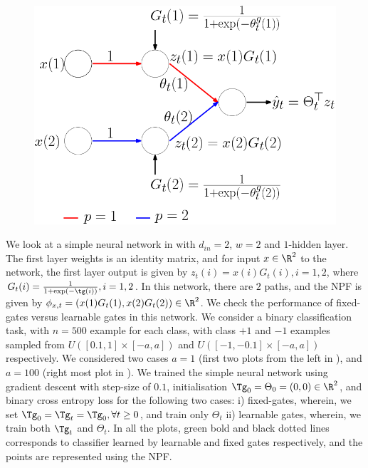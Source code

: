 \begin{figure}
\includegraphics[scale=0.14]{figs/featlearn.png}
\caption{\label{fig:net}}
\end{figure}
We look at a simple neural network in  with $d_{in}=2$, $w=2$ and $1$-hidden layer. The first layer weights is an identity matrix, and for input $x\in\R^2$ to the network, the first layer output is given by $z_{t}(i)=x(i)G_t(i),i=1,2$, where $G_t(i)=\frac{1}{1+\exp(-\tg(i))},i=1,2$. In this network, there are $2$ paths, and the NPF is given by $\phi_{x,t}=(x(1)G_t(1),x(2)G_t(2))\in \R^2$. We check the performance of fixed-gates versus learnable gates in this network. We consider a binary classification task, with $n=500$ example for each class, with class $+1$ and $-1$  examples sampled from $U([0.1,1]\times [-a,a])$ and $U([-1,-0.1]\times[-a,a])$ respectively. \WFclear We considered two cases $a=1$ (first two plots from the left in ), and $a=100$ (right most plot in ). 
We trained the simple neural network using gradient descent with step-size of $0.1$, initialisation $\Tg_0=\Theta_0=(0,0)\in\R^2$, and binary cross entropy loss for the following two cases: i) fixed-gates, wherein, we set $\Tg_0=\Tg_t=\Tg_0,\forall t\geq 0$, and train only $\Theta_t$ ii) learnable gates, wherein, we train both $\Tg_t$ and $\Theta_t$. In all the plots, green bold and black dotted lines corresponds to classifier learned  by learnable and fixed gates respectively, and the points are represented using the NPF.\\
